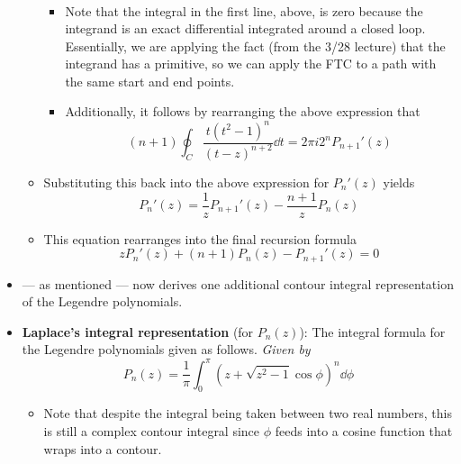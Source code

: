 \documentclass[../finalProject.tex]{subfiles}
\begin{document}
\begin{itemize}
\begin{itemize}
\begin{align*}
        \end{align*}
        \begin{itemize}
            \item Note that the integral in the first line, above, is zero because the integrand is an exact differential integrated around a closed loop. Essentially, we are applying the fact (from the 3/28 lecture) that the integrand has a primitive, so we can apply the FTC to a path with the same start and end points.
            \item Additionally, it follows by rearranging the above expression that
            \begin{equation*}
                (n+1)\oint_C\frac{t(t^2-1)^n}{(t-z)^{n+2}}\dd{t} = 2\pi i2^nP_{n+1}'(z)
            \end{equation*}
        \end{itemize}
        \item Substituting this back into the above expression for $P_n'(z)$ yields
        \begin{equation*}
            P_n'(z) = \frac{1}{z}P_{n+1}'(z)-\frac{n+1}{z}P_n(z)
        \end{equation*}
        \item This equation rearranges into the final recursion formula
        \begin{equation*}
            zP_n'(z)+(n+1)P_n(z)-P_{n+1}'(z) = 0
        \end{equation*}
    \end{itemize}
    \item \textcite{bib:Seaborn} --- as mentioned --- now derives one additional contour integral representation of the Legendre polynomials.
    \item \textbf{Laplace's integral representation} (for $P_n(z)$): The integral formula for the Legendre polynomials given as follows. \emph{Given by}
    \begin{equation*}
        P_n(z) = \frac{1}{\pi}\int_0^\pi(z+\sqrt{z^2-1}\cos\phi)^n\dd\phi
    \end{equation*}
    \begin{itemize}
        \item Note that despite the integral being taken between two real numbers, this is still a complex contour integral since $\phi$ feeds into a cosine function that wraps into a contour.
    \end{itemize}
\end{itemize}


\end{document}
